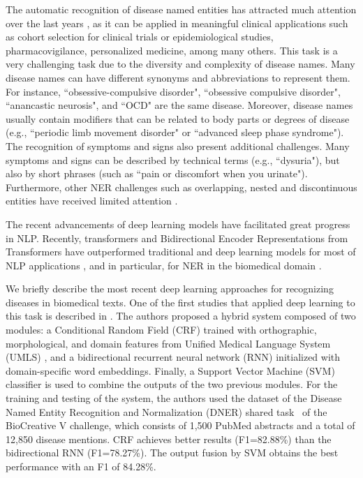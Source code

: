 \documentclass[preprint,12pt]{elsarticle}
\begin{document}
The automatic recognition of disease named entities has attracted much attention over the last years  \cite{wei2016disease,habibi2017deep,xu2018sblc,zhao2017disease,ling2019domain,lee2020biobert,li2019fine}, as it can be applied in meaningful clinical applications such as cohort selection for clinical trials or epidemiological studies, pharmacovigilance, personalized medicine, among many others. 
This task is a very challenging task due to the diversity and complexity of disease names. Many disease names can have different synonyms and abbreviations to represent them. For instance, ``obsessive-compulsive disorder", ``obsessive compulsive disorder", ``anancastic neurosis", and ``OCD" are the same disease. Moreover, disease names usually contain modifiers that can be related to body parts or degrees of disease (e.g., ``periodic limb movement disorder" or ``advanced sleep phase syndrome"). 
The recognition of symptoms and signs also present additional challenges. 
Many symptoms  and signs can be described by technical terms (e.g., ``dysuria"), but also by short phrases (such as ``pain or discomfort when you urinate").
Furthermore, other NER challenges such as overlapping, nested and discontinuous entities have received limited attention  \cite{fei2021rethinking}.

The recent advancements of deep learning models have facilitated great progress in NLP. Recently, transformers  \cite{vaswani2017attention} and Bidirectional Encoder Representations from Transformers  \cite{devlin-etal-2019-bert} have outperformed traditional and  deep learning models for most of NLP applications \cite{yang2019xlnet,wu2019enriching,lewis-etal-2020-bart,zheng2019new}, and in particular, for NER in the biomedical domain \cite{lee2020biobert,hakala-pyysalo-2019-biomedical}. 

We briefly describe the most recent deep learning approaches for recognizing diseases in biomedical texts. One of the first studies that applied deep learning to this task is described in  \cite{wei2016disease}. The authors proposed a hybrid system composed of two modules: a  Conditional Random Field (CRF) \cite{lafferty2001conditional}  trained with orthographic, morphological, and domain features from Unified Medical Language System (UMLS) \cite{bodenreider2004unified},  and a bidirectional recurrent neural network (RNN) initialized with domain-specific word embeddings. Finally, a Support Vector Machine (SVM) classifier is used to combine the outputs of the two previous modules.  For the training and testing of the system, the authors used the dataset of the Disease Named Entity Recognition and Normalization (DNER) shared task~ \cite{wei2015overview} of the BioCreative V challenge, which consists of 1,500 PubMed abstracts and a total of 12,850 disease mentions. CRF achieves better results (F1=82.88\%) than the bidirectional RNN (F1=78.27\%). The output fusion by SVM obtains the best performance with an F1 of 84.28\%.
\end{document}
